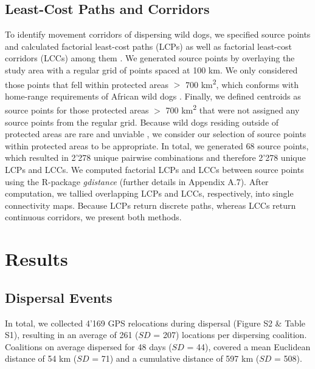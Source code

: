 \documentclass[abstract=on,10pt,a4paper,bibliography=totocnumbered]{article}
\begin{document}
\subsection{Least-Cost Paths and Corridors}
To identify movement corridors of dispersing wild dogs, we specified source
points and calculated factorial least-cost paths (LCPs) as well as factorial
least-cost corridors (LCCs) among them \citep{Elliot.2014}. We generated source
points by overlaying the study area with a regular grid of points spaced at 100
km. We only considered those points that fell within protected areas \(>\) 700
km\textsuperscript{2}, which conforms with home-range requirements of African
wild dogs \citep{Pomilia.2015}. Finally, we defined centroids as source points
for those protected areas \(>\) 700 km\textsuperscript{2} that were not assigned
any source points from the regular grid. Because wild dogs residing outside of
protected areas are rare and unviable \citep{VanDerMeer.2014}, we consider our
selection of source points within protected areas to be appropriate. In total,
we generated 68 source points, which resulted in 2'278 unique pairwise
combinations and therefore 2'278 unique LCPs and LCCs. We computed factorial
LCPs and LCCs between source points using the R-package \textit{gdistance}
(further details in Appendix A.7). After computation, we tallied overlapping
LCPs and LCCs, respectively, into single connectivity maps. Because LCPs return
discrete paths, whereas LCCs return continuous corridors, we present both
methods.

\section{Results}
\subsection{Dispersal Events}
In total, we collected 4'169 GPS relocations during dispersal (Figure S2 \&
Table S1), resulting in an average of 261 (\(SD\) = 207) locations per
dispersing coalition. Coalitions on average dispersed for 48 days (\(SD\) = 44),
covered a mean Euclidean distance of 54 km (\(SD\) = 71) and a cumulative
distance of 597 km (\(SD\) = 508).
\end{document}
